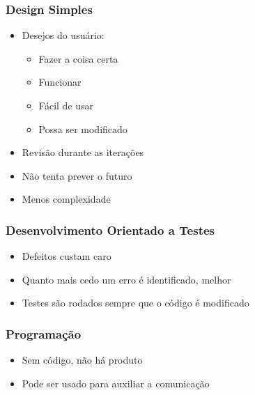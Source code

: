 \documentclass[10pt]{beamer}
\begin{document}
\begin{frame}
  \frametitle{Design Simples}
  \begin{itemize}
  \item Desejos do usuário:
  \begin{itemize}
    \item Fazer a coisa certa
    \item Funcionar
    \item Fácil de usar
    \item Possa ser modificado
  \end{itemize}
  \item Revisão durante as iterações
  \item Não tenta prever o futuro
  \item Menos complexidade
  \end{itemize}
\end{frame}

\begin{frame}
  \frametitle{Desenvolvimento Orientado a Testes}
  \begin{itemize}
  \item Defeitos custam caro
  \item Quanto mais cedo um erro é identificado, melhor
  \item Testes são rodados sempre que o código é modificado
  \end{itemize}
\end{frame}

\begin{frame}
  \frametitle{Programação}
  \begin{itemize}
  \item Sem código, não há produto
  \item Pode ser usado para auxiliar a comunicação
  \end{itemize}
\end{frame}
\end{document}
